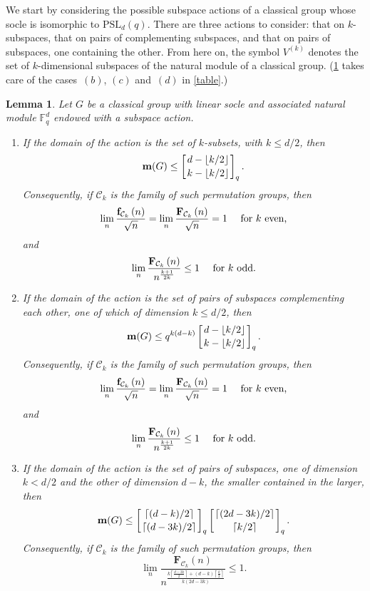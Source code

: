 \documentclass[a4paper]{amsart}
\newcommand{\f}{\mathbf{f}}
\newcommand{\F}{\mathbf{F}}
\newcommand{\FF}{\mathbb{F}}
\newcommand{\m}{\mathbf{m}}
\newcommand{\C}{\mathcal{C}}
\newtheorem{lemma}[theorem]{Lemma}
\theoremstyle{definition}
\begin{document}
We start by considering the possible subspace actions of a classical group whose socle is isomorphic to $\mathrm{PSL}_d(q)$. There are three actions to consider: that on $k$-subspaces, that on pairs of complementing subspaces, and that on pairs of subspaces, one containing the other. From here on, the symbol $V^{(k)}$ denotes the set of $k$-dimensional subspaces of the natural module of a classical group.
(\cref{lem:PSL} takes care of the cases~$(b)$, $(c)$ and~$(d)$ in \cref{table}.)
\begin{lemma}\label{lem:PSL}
    Let $G$ be a classical group with linear socle and associated natural module $\FF_q^d$ endowed with a subspace action.
    \begin{enumerate}[$(i)$]
        \item If the domain of the action is the set of $k$-subsets, with $k\le d/2$, then
        \[\m(G) \le \left[ d-\lfloor k/2\rfloor \atop k-\lfloor k/2\rfloor\right]_q .\]
        Consequently, if $\C_k$ is the family of such permutation groups, then
        \[ \lim_n\frac{\f_{\C_k}\left(n\right)}{\sqrt{n}} = \lim_n\frac{\F_{\C_k}\left(n\right)}{\sqrt{n}} = 1 \quad \hbox{ for } k \hbox{ even,}\]
        and
        \[ \lim_n\frac{\F_{\C_k}\left(n\right)}{n^{\frac{k+1}{2k}}} \le 1 \quad \hbox{ for } k \hbox{ odd} .\] 
        \item If the domain of the action is the set of pairs of subspaces complementing each other, one of which of dimension $k\le d/2$, then
        \[\m(G) \le q^{k(d-k)}\left[ d-\lfloor k/2\rfloor \atop k-\lfloor k/2\rfloor\right]_q .\]
        Consequently, if $\C_k$ is the family of such permutation groups, then
        \[ \lim_n\frac{\f_{\C_k}\left(n\right)}{\sqrt{n}} = \lim_n\frac{\F_{\C_k}\left(n\right)}{\sqrt{n}} = 1 \quad \hbox{ for } k \hbox{ even,}\]
        and
        \[ \lim_n\frac{\F_{\C_k}\left(n\right)}{n^{\frac{k+1}{2k}}} \le 1 \quad \hbox{ for } k \hbox{ odd} .\]
        \item If the domain of the action is the set of pairs of subspaces, one of dimension $k < d/2$ and the other of dimension $d-k$, the smaller contained in the larger, then
        \[\m(G) \le \left[ \lceil (d-k)/2 \rceil \atop \lceil (d-3k)/2\rceil \right]_q \left[ \lceil(2d -3k) /2 \rceil \atop \lceil k/2\rceil \right]_q .\]
        Consequently, if $\C_k$ is the family of such permutation groups, then
        \[ \lim_n\frac{\F_{\C_k}\left(n\right)}{n^{\frac{k \left\lceil \frac{d - 3k}{2} \right\rceil + (d-k) \left\lceil \frac{k}{2} \right\rceil}{k(2d-3k)}}} \le 1 .\]
    \end{enumerate}
\end{lemma}
\end{document}
